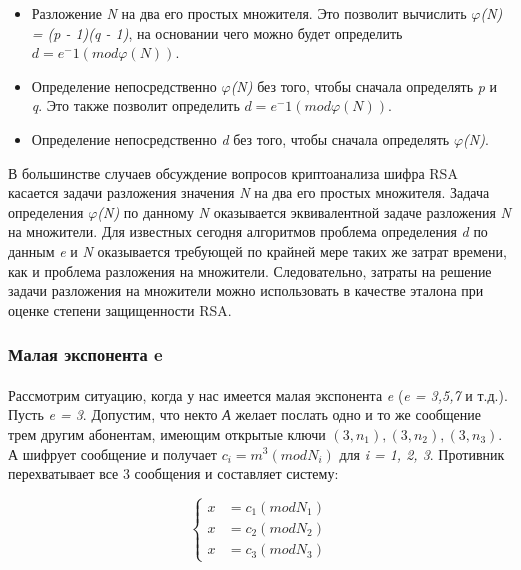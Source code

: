     \begin{itemize}
     \item Разложение \textit{N} на два его простых множителя. Это позволит вычислить \textit{{$\varphi$}(N) = (p - 1)(q - 1)}, на основании чего можно будет 
     определить \textit{{$d = e^-1(mod \varphi(N))$}}.
     \item Определение непосредственно \textit{{$\varphi$}(N)} без того, чтобы сначала определять \textit{p} и \textit{q}. Это также позволит
     определить \textit{{$d = e^-1(mod \varphi(N))$}}.
     \item Определение непосредственно \textit{d} без того, чтобы сначала определять \textit{{$\varphi$}(N)}.
    \end{itemize}
    
  В большинстве случаев обсуждение вопросов криптоанализа шифра RSA касается задачи разложения значения \textit{N} на два его простых множителя. 
  Задача определения \textit{{$\varphi$}(N)} по данному \textit{N} оказывается эквивалентной задаче разложения \textit{N} на множители. Для известных сегодня алгоритмов 
  проблема определения \textit{d} по данным \textit{e} и \textit{N} оказывается требующей по крайней мере таких же затрат времени, как и проблема разложения на 
  множители. Следовательно, затраты на решение задачи разложения на множители можно использовать в качестве эталона при оценке степени 
  защищенности RSA.

\subsubsection{Малая экспонента e}

  \paragraph{} Рассмотрим ситуацию, когда у нас имеется малая экспонента \textit{e} (\textit{e = 3,5,7} и т.д.). Пусть \textit{e = 3}. Допустим, что некто
  \textit{А} желает послать одно и то же сообщение трем другим абонентам, имеющим открытые ключи \textit{{$(3, n_1), (3, n_2), (3, n_3)$}}. А шифрует 
  сообщение и получает \textit{{$c_i = m^3(mod N_i)$}} для \textit{i = 1, 2, 3}. Противник перехватывает все 3 сообщения и составляет систему:
  
    \begin{equation}
	\begin{cases}
	   x &= c_1(mod N_1) \\
	   x &= c_2(mod N_2)\\
	   x &= c_3(mod N_3)
	\end{cases}    
    \end{equation}

